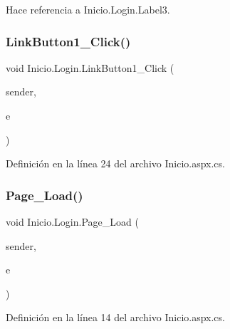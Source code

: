Hace referencia a Inicio.\+Login.\+Label3.

\mbox{\label{classInicio_1_1Login_a4d29cabcb378199a88f9ec9dc57961da}} 
\subsubsection{\texorpdfstring{LinkButton1\_Click()}{LinkButton1\_Click()}}
{\footnotesize\ttfamily void Inicio.\+Login.\+Link\+Button1\+\_\+\+Click (\begin{DoxyParamCaption}\item[{object}]{sender,  }\item[{Event\+Args}]{e }\end{DoxyParamCaption})\hspace{0.3cm}{\ttfamily [protected]}}



Definición en la línea 24 del archivo Inicio.\+aspx.\+cs.


\begin{DoxyCode}{0}

\end{DoxyCode}
\mbox{\label{classInicio_1_1Login_a82c40c536f8833e113c9149c09b1f4de}} 
\subsubsection{\texorpdfstring{Page\_Load()}{Page\_Load()}}
{\footnotesize\ttfamily void Inicio.\+Login.\+Page\+\_\+\+Load (\begin{DoxyParamCaption}\item[{object}]{sender,  }\item[{Event\+Args}]{e }\end{DoxyParamCaption})\hspace{0.3cm}{\ttfamily [protected]}}



Definición en la línea 14 del archivo Inicio.\+aspx.\+cs.


\begin{DoxyCode}{0}

\end{DoxyCode}
\mbox{\label{classInicio_1_1Login_ac97e06c22c6f6ac020c4cf2eff5e48ea}} 
